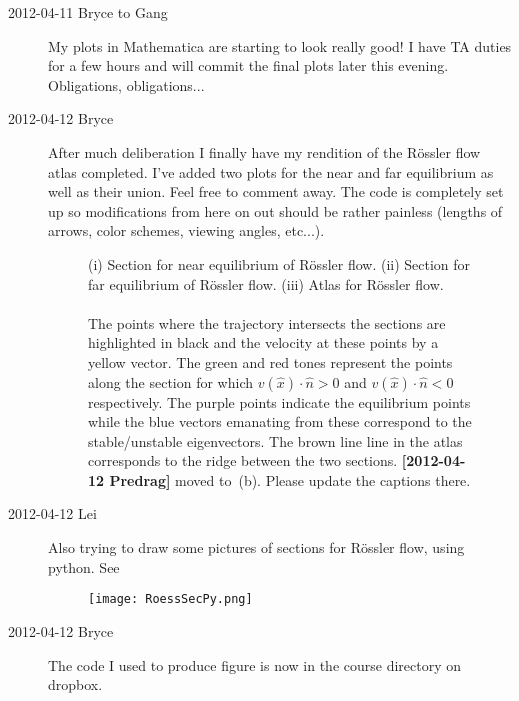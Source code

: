 \begin{description}
\item[2012-04-11 Bryce to Gang] My plots in Mathematica are starting to
look really good! I have TA duties for a few hours and will commit the
final plots later this evening. Obligations, obligations...

\item[2012-04-12 Bryce] After much deliberation I finally have my
rendition of the R\"ossler flow atlas completed. I've added two plots for
the near and far equilibrium as well as their union. Feel free to comment
away. The code is completely set up so modifications from here on out
should be rather painless (lengths of arrows, color schemes, viewing
angles, etc...).

 \begin{figure}[H]
 \begin{center}
 \end{center}
 \caption{\label{fig:roesslerSections}(i) Section for near equilibrium of
 R\"ossler flow. (ii) Section for far equilibrium of R\"ossler flow.
 (iii) Atlas for R\"ossler flow. \\ \\The points where the trajectory
 intersects the sections are highlighted in black and the velocity at
 these points by a yellow vector. The green and red tones represent the
 points along the section for which $v(\hat{x})\cdot\hat{n}>0$ and
 $v(\hat{x})\cdot\hat{n}<0$ respectively. The purple points indicate the
 equilibrium points while the blue vectors emanating from these
 correspond to the stable/unstable eigenvectors. The brown line line in
 the atlas corresponds to the ridge between the two sections.
 {\bf [2012-04-12 Predrag]} moved to \,(b). Please update the
 captions there.
 }
 \end{figure}

 \item[2012-04-12 Lei] Also trying to draw some pictures of sections for
 R\"ossler flow, using python. See 
 \begin{figure}[H]
 \begin{center}
 \texttt{[image: RoessSecPy.png]}
 \end{center}
 \caption{\label{fig:RoessSecPy}}
 \end{figure}

\item[2012-04-12 Bryce] The code I used to produce figure
 is now in the course directory on dropbox.


\end{description}
